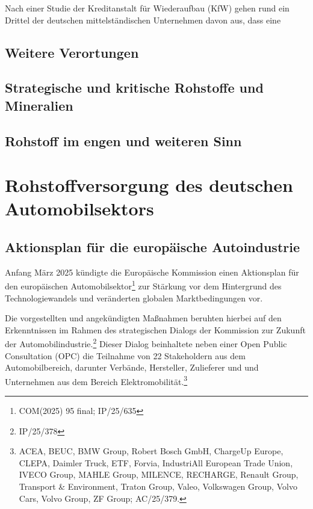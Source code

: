 \documentclass[12pt,a4paper,oneside]{book} %
\begin{document}
	
	
	
	Nach einer Studie der Kreditanstalt für Wiederaufbau (KfW) gehen rund ein Drittel der deutschen mittelständischen Unternehmen davon aus, dass eine 
	
	\subsection{Weitere Verortungen}
	
	
	\subsection{Strategische und kritische Rohstoffe und Mineralien}
	
	\subsection{Rohstoff im engen und weiteren Sinn}
	
	\section{Rohstoffversorgung des deutschen Automobilsektors}
	
	
	\subsection{Aktionsplan für die europäische Autoindustrie}
	Anfang März 2025 kündigte die Europäische Kommission einen Aktionsplan für den europäischen Automobilsektor\footnote{COM(2025) 95 final; IP/25/635} zur Stärkung vor dem Hintergrund des Technologiewandels und veränderten globalen Marktbedingungen vor.
	
	Die vorgestellten und angekündigten Maßnahmen beruhten hierbei auf den Erkenntnissen im Rahmen des strategischen Dialogs der Kommission zur Zukunft der Automobilindustrie.\footnote{IP/25/378} Dieser Dialog beinhaltete neben einer Open Public Consultation (OPC) die Teilnahme von 22 Stakeholdern aus dem Automobilbereich, darunter Verbände, Hersteller, Zulieferer und und Unternehmen aus dem Bereich Elektromobilität.\footnote{ACEA, BEUC, BMW Group, Robert Bosch GmbH, ChargeUp Europe, CLEPA, Daimler Truck, ETF, Forvia, IndustriAll European Trade Union, IVECO Group, MAHLE Group, MILENCE, RECHARGE, Renault Group, Transport \& Environment, Traton Group, Valeo, Volkswagen Group, Volvo Cars, Volvo Group, ZF Group; AC/25/379.}
	
\end{document}
